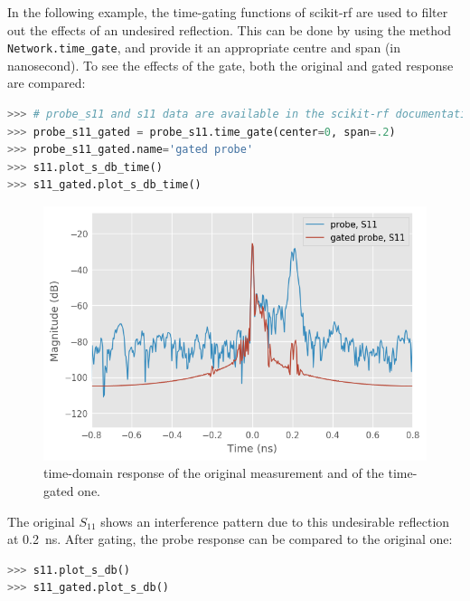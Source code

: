 \documentclass{IEEEjmw}
\begin{document}
In the following example, the time-gating functions of scikit-rf are used to filter out the effects of an undesired reflection. This can be done by using the method \texttt{Network.time\_gate}, and provide it an appropriate centre and span (in nanosecond). To see the effects of the gate, both the original and gated response are compared:

\begin{lstlisting}[language=Python]
>>> # probe_s11 and s11 data are available in the scikit-rf documentation
>>> probe_s11_gated = probe_s11.time_gate(center=0, span=.2)
>>> probe_s11_gated.name='gated probe'
>>> s11.plot_s_db_time()
>>> s11_gated.plot_s_db_time()
\end{lstlisting}

\begin{figure}
	\centering
	\includegraphics[width=0.95\linewidth]{figures/time_domain1}
	\caption{time-domain response of the original measurement and of the time-gated one.}
	\label{fig:gated1}
\end{figure}


The original $S_{11}$ shows an interference pattern due to this undesirable reflection at \SI{0.2}{\nano\second}. After gating, the probe response can be compared to the original one:

\begin{lstlisting}[language=Python]
>>> s11.plot_s_db()
>>> s11_gated.plot_s_db()
\end{lstlisting}
\end{document}
